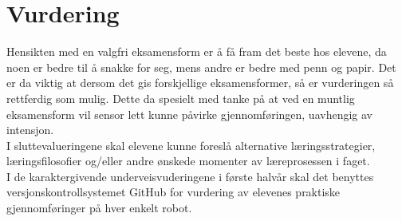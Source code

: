 \section{Vurdering} \label{Sec: Vurdering}


Hensikten med en valgfri eksamensform er å få fram det beste hos elevene, da noen er bedre til å snakke for seg, mens andre er bedre med penn og papir.
Det er da viktig at dersom det gis forskjellige eksamensformer, så er vurderingen så rettferdig som mulig. Dette da spesielt med tanke på at ved en muntlig eksamensform vil sensor lett kunne påvirke gjennomføringen, uavhengig av intensjon. \\

I sluttevalueringene skal elevene kunne foreslå alternative læringsstrategier, læringsfilosofier og/eller andre ønskede momenter av læreprosessen i faget.\\

I de karaktergivende underveisvuderingene i første halvår skal det benyttes versjonskontrollsystemet GitHub for vurdering av elevenes praktiske gjennomføringer på hver enkelt robot.
